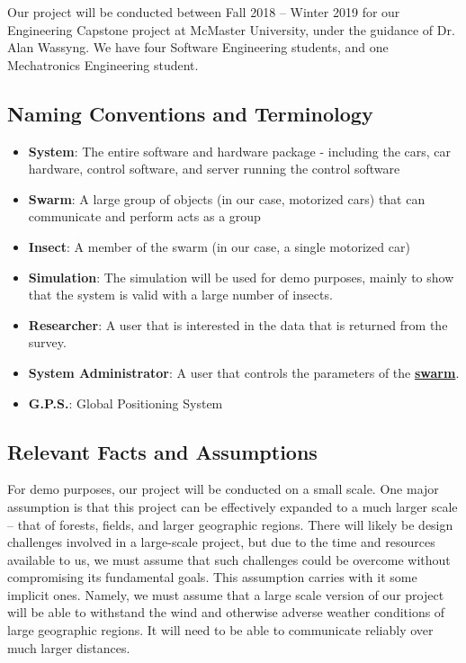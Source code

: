 \documentclass[11pt]{article}
\begin{document}
Our project will be conducted between Fall 2018 – Winter 2019 for our Engineering Capstone project at McMaster University, under the guidance of Dr. Alan Wassyng. We have four Software Engineering students, and one Mechatronics Engineering student.

\subsection{Naming Conventions and Terminology}

\label{sec:definitions}
\begin{itemize}
\item \textbf{System}: The entire software and hardware package - including the cars,
car hardware, control software, and server running the control software
\item \textbf{Swarm}: A large group of objects (in our case, motorized cars) that can communicate and perform acts as a group
\item \textbf{Insect}: A member of the swarm (in our case, a single motorized car)
\item \textbf{Simulation}: The simulation will be used for demo purposes, mainly to show that
the system is valid with a large number of insects.
\item \textbf{Researcher}: A user that is interested in the data that is returned from the survey.
\item \textbf{System Administrator}: A user that controls the parameters of the \hyperref[sec:definitions]{\textbf{swarm}}.
\item \textbf{G.P.S.}: Global Positioning System
\end{itemize}

\subsection{Relevant Facts and Assumptions}

For demo purposes, our project will be conducted on a small scale. One major assumption is that this project can be effectively expanded to a much larger scale – that of forests, fields, and larger geographic regions. There will likely be design challenges involved in a large-scale project, but due to the time and resources available to us, we must assume that such challenges could be overcome without compromising its fundamental goals. This assumption carries with it some implicit ones. Namely, we must assume that a large scale version of our project will be able to withstand the wind and otherwise adverse weather conditions of large geographic regions. It will need to be able to communicate reliably over much larger distances.\\
\end{document}
